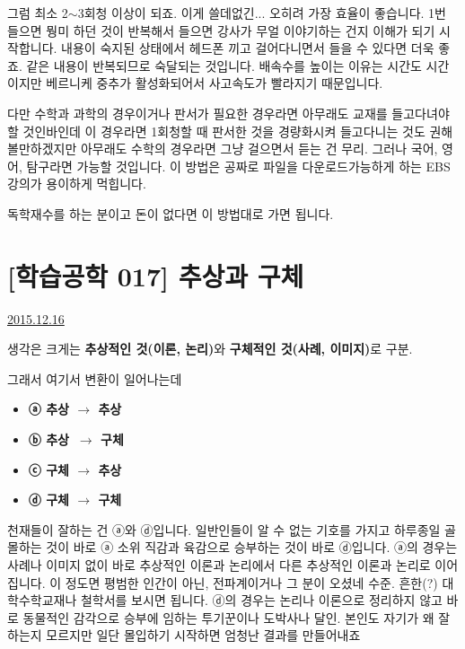 그럼 최소 2$\sim$3회청 이상이 되죠. 이게 쓸데없긴... 오히려 가장 효율이 좋습니다.
1번 들으면 뭥미 하던 것이 반복해서 들으면 강사가 무얼 이야기하는 건지 이해가 되기 시작합니다.
내용이 숙지된 상태에서 헤드폰 끼고 걸어다니면서 들을 수 있다면 더욱 좋죠. 같은 내용이 반복되므로 숙달되는 것입니다.
배속수를 높이는 이유는 시간도 시간이지만 베르니케 중추가 활성화되어서 사고속도가 빨라지기 때문입니다.
\vspace{5mm}

다만 수학과 과학의 경우이거나 판서가 필요한 경우라면 아무래도 교재를 들고다녀야할 것인바인데
이 경우라면 1회청할 때 판서한 것을 경량화시켜 들고다니는 것도 권해볼만하겠지만
아무래도 수학의 경우라면 그냥 걸으면서 듣는 건 무리. 그러나 국어, 영어, 탐구라면 가능할 것입니다.
이 방법은 공짜로 파일을 다운로드가능하게 하는 EBS 강의가 용이하게 먹힙니다.
\vspace{5mm}

독학재수를 하는 분이고 돈이 없다면 이 방법대로 가면 됩니다.





\section{[학습공학 017] 추상과 구체}
\href{https://www.kockoc.com/Apoc/548030}{2015.12.16}

\vspace{5mm}

생각은 크게는 \textbf{추상적인 것(이론, 논리)}와 \textbf{구체적인 것(사례, 이미지)}로 구분.
\vspace{5mm}

그래서 여기서 변환이 일어나는데
\vspace{5mm}

\begin{itemize}
    \item \textbf{ⓐ 추상 $\rightarrow$ 추상}
    \item \textbf{ⓑ 추상 $\rightarrow$ 구체}
    \item \textbf{ⓒ 구체 $\rightarrow$ 추상}
    \item \textbf{ⓓ 구체 $\rightarrow$ 구체}
\end{itemize}
\vspace{5mm}

천재들이 잘하는 건 ⓐ와 ⓓ입니다.
일반인들이 알 수 없는 기호를 가지고 하루종일 골몰하는 것이 바로 ⓐ
소위 직감과 육감으로 승부하는 것이 바로 ⓓ입니다.
ⓐ의 경우는 사례나 이미지 없이 바로 추상적인 이론과 논리에서 다른 추상적인 이론과 논리로 이어집니다.
이 정도면 평범한 인간이 아닌, 전파계이거나 그 분이 오셨네 수준. 흔한(?) 대학수학교재나 철학서를 보시면 됩니다.
ⓓ의 경우는 논리나 이론으로 정리하지 않고 바로 동물적인 감각으로 승부에 임하는 투기꾼이나 도박사나 달인.
본인도 자기가 왜 잘 하는지 모르지만 일단 몰입하기 시작하면 엄청난 결과를 만들어내죠
\vspace{5mm}

